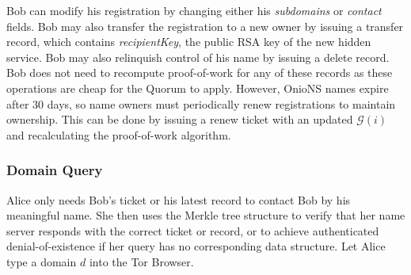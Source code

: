 \documentclass[USenglish,oneside,twocolumn]{article}
\begin{document}
Bob can modify his registration by changing either his \emph{subdomains} or \emph{contact} fields. Bob may also transfer the registration to a new owner by issuing a transfer record, which contains \emph{recipientKey}, the public RSA key of the new hidden service. Bob may also relinquish control of his name by issuing a delete record. Bob does not need to recompute proof-of-work for any of these records as these operations are cheap for the Quorum to apply. However, OnioNS names expire after 30 days, so name owners must periodically renew registrations to maintain ownership. This can be done by issuing a renew ticket with an updated $ \mathcal{G}(i) $ and recalculating the proof-of-work algorithm.


\subsubsection{Domain Query}

Alice only needs Bob's ticket or his latest record to contact Bob by his meaningful name. She then uses the Merkle tree structure to verify that her name server responds with the correct ticket or record, or to achieve authenticated denial-of-existence if her query has no corresponding data structure. Let Alice type a domain $ d $ into the Tor Browser.
\end{document}
